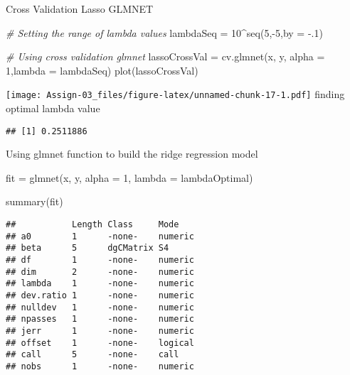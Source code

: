 \documentclass[
]{article}
\newenvironment{Shaded}{\begin{snugshade}}{\end{snugshade}}
\newcommand{\AttributeTok}[1]{\textcolor[rgb]{0.77,0.63,0.00}{#1}}
\newcommand{\CommentTok}[1]{\textcolor[rgb]{0.56,0.35,0.01}{\textit{#1}}}
\newcommand{\DecValTok}[1]{\textcolor[rgb]{0.00,0.00,0.81}{#1}}
\newcommand{\FunctionTok}[1]{\textcolor[rgb]{0.00,0.00,0.00}{#1}}
\newcommand{\NormalTok}[1]{#1}
\newcommand{\OtherTok}[1]{\textcolor[rgb]{0.56,0.35,0.01}{#1}}
\newcommand{\SpecialCharTok}[1]{\textcolor[rgb]{0.00,0.00,0.00}{#1}}
\begin{document}
Cross Validation Lasso GLMNET

\begin{Shaded}
\begin{Highlighting}[]
\CommentTok{\# Setting the range of lambda values}
\NormalTok{lambdaSeq }\OtherTok{=} \DecValTok{10}\SpecialCharTok{\^{}}\FunctionTok{seq}\NormalTok{(}\DecValTok{5}\NormalTok{,}\SpecialCharTok{{-}}\DecValTok{5}\NormalTok{,}\AttributeTok{by =} \SpecialCharTok{{-}}\NormalTok{.}\DecValTok{1}\NormalTok{)}

\CommentTok{\# Using cross validation glmnet}
\NormalTok{lassoCrossVal }\OtherTok{=} \FunctionTok{cv.glmnet}\NormalTok{(x, y, }\AttributeTok{alpha =} \DecValTok{1}\NormalTok{,}\AttributeTok{lambda =}\NormalTok{ lambdaSeq)}
\FunctionTok{plot}\NormalTok{(lassoCrossVal)}
\end{Highlighting}
\end{Shaded}

\texttt{[image: Assign-03\_files/figure-latex/unnamed-chunk-17-1.pdf]}
finding optimal lambda value

\begin{Shaded}
\end{Shaded}

\begin{verbatim}
## [1] 0.2511886
\end{verbatim}

Using glmnet function to build the ridge regression model

\begin{Shaded}
\begin{Highlighting}[]
\NormalTok{fit }\OtherTok{=} \FunctionTok{glmnet}\NormalTok{(x, y, }\AttributeTok{alpha =} \DecValTok{1}\NormalTok{, }\AttributeTok{lambda  =}\NormalTok{ lambdaOptimal)}

\FunctionTok{summary}\NormalTok{(fit)}
\end{Highlighting}
\end{Shaded}

\begin{verbatim}
##           Length Class     Mode   
## a0        1      -none-    numeric
## beta      5      dgCMatrix S4     
## df        1      -none-    numeric
## dim       2      -none-    numeric
## lambda    1      -none-    numeric
## dev.ratio 1      -none-    numeric
## nulldev   1      -none-    numeric
## npasses   1      -none-    numeric
## jerr      1      -none-    numeric
## offset    1      -none-    logical
## call      5      -none-    call   
## nobs      1      -none-    numeric
\end{verbatim}
\end{document}
